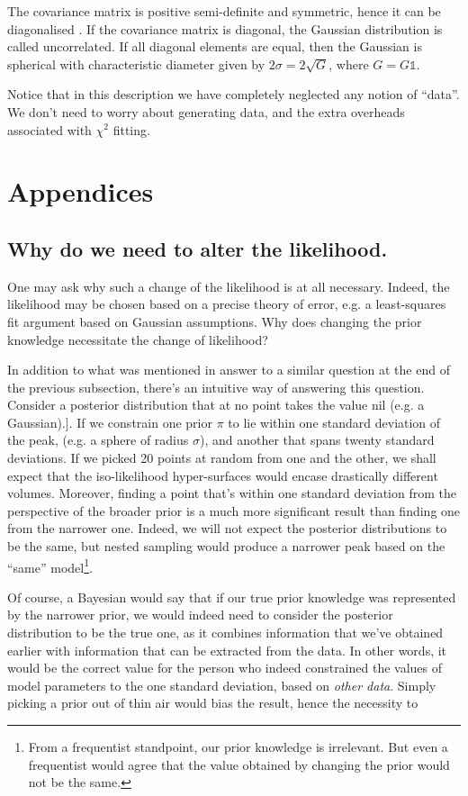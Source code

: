 \documentclass[usenatbib]{mnras}
\begin{document}
The covariance matrix is positive semi-definite and symmetric,
hence it can be diagonalised \citep{taboga2017lectures}. If the covariance matrix is diagonal,
the Gaussian distribution is called uncorrelated. If all diagonal
elements are equal, then the Gaussian is spherical with
characteristic diameter given by \(2 \sigma = 2\sqrt{G}\), where \(G = G
   \mathbb{1}\).

Notice that in this description we have completely neglected any
notion of ``data''. We don't need to worry about generating data,
and the extra overheads associated with \(\chi^2\) fitting.


\section{Appendices}
\label{sec:org846c240}

\subsection{Why do we need to alter the likelihood. \label{sec:repart-necessity}}
\label{sec:org0ee1059}
One may ask why such a change of the likelihood is at all
necessary. Indeed, the likelihood may be chosen based on a precise
theory of error, e.g. a least-squares fit argument based on
Gaussian assumptions. Why does changing the prior knowledge
necessitate the change of likelihood?

In addition to what was mentioned in answer to a similar question
at the end of the previous subsection, there's an intuitive way of
answering this question. Consider a posterior distribution that at
no point takes the value nil (e.g. a Gaussian).]. If we constrain one
prior \(\pi\) to lie within one standard deviation of the peak,
(e.g. a sphere of radius \(\sigma\)), and another that spans twenty
standard deviations. If we picked 20 points at random from one and
the other, we shall expect that the iso-likelihood hyper-surfaces
would encase drastically different volumes. Moreover, finding a
point that's within one standard deviation from the perspective of
the broader prior is a much more significant result than finding
one from the narrower one. Indeed, we will not expect the posterior
distributions to be the same, but nested sampling would produce a
narrower peak based on the ``same'' model\footnote{From a   frequentist standpoint, our prior knowledge is irrelevant. But even   a frequentist would agree that the value obtained by changing the   prior would not be the same. }. 

Of course, a Bayesian would say that if our true prior knowledge
was represented by the narrower prior, we would indeed need to
consider the posterior distribution to be the true one, as it
combines information that we've obtained earlier with information
that can be extracted from the data. In other words, it would be
the correct value for the person who indeed constrained the values
of model parameters to the one standard deviation, based on \emph{other
data}. Simply picking a prior out of thin air would bias the result, hence the necessity to 

 

\end{document}
